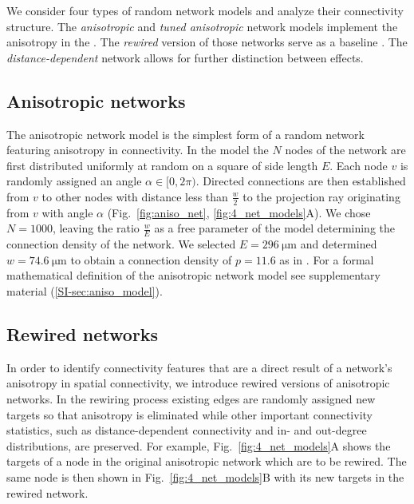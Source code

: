 
We consider four types of random network models and analyze their
connectivity structure. The \textit{anisotropic} and \textit{tuned
anisotropic} network models implement the anisotropy in the
. The \textit{rewired} version of those networks serve as a baseline
. The \textit{distance-dependent} network allows for further
distinction between effects.

\subsection*{Anisotropic networks}

The anisotropic network model is the simplest form of a random network
featuring anisotropy in connectivity. In the model the $N$ nodes of
the network are first distributed uniformly at random on a square of
side length $E$. Each node $v$ is randomly assigned an angle
$\alpha \in [0,2\pi)$. Directed connections are then established from
$v$ to other nodes with distance less than $\frac{w}{2}$ to the
projection ray originating from $v$ with angle $\alpha$
(Fig.~\ref{fig:aniso_net}, \ref{fig:4_net_models}A). We chose
$N=1000$, leaving the ratio $\frac{w}{E}$ as a free parameter of the
model determining the connection density of the network. We selected
$E=\SI{296}{\micro\meter}$ and determined $w=\SI{74.6}%
{\micro\meter}$ to obtain a connection density of $p=11.6$ as in
\cite{Song2005}. For a formal mathematical definition of the
anisotropic network model see supplementary material
(\ref{SI-sec:aniso_model}).






\bigskip

\subsection*{Rewired networks}
%
In order to identify connectivity features that are a direct result of
a network's anisotropy in spatial connectivity, we introduce rewired
versions of anisotropic networks. In the rewiring process existing
edges are randomly assigned new targets so that anisotropy is
eliminated while other important connectivity statistics, such as
distance-dependent connectivity and in- and out-degree distributions,
are preserved. For example, Fig.~\ref{fig:4_net_models}A shows the
targets of a node in the original anisotropic network which are to be
rewired. The same node is then shown in Fig.~\ref{fig:4_net_models}B
with its new targets in the rewired network.
%

